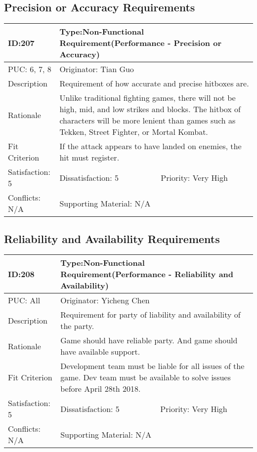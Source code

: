 \documentclass{article}
\begin{document}
	\subsection{Precision or Accuracy Requirements}
	\begin{table}[H]
		\begin{tabular}{|l|l|l|}
			\hline
			ID:207 & \multicolumn{2}{l|}{Type:Non-Functional Requirement(Performance - Precision or Accuracy)} \\ \hline
			PUC: 6, 7, 8 & \multicolumn{2}{l|}{Originator: Tian Guo} \\ \hline
			Description & \multicolumn{2}{m{0.85\textwidth}|}{Requirement of how accurate and precise hitboxes are.} \\ \hline
			Rationale & \multicolumn{2}{m{0.85\textwidth}|}{Unlike traditional fighting games, there will not be high, mid, and low strikes and blocks. The hitbox of characters will be more lenient than games such as Tekken, Street Fighter, or Mortal Kombat.} \\ \hline
			Fit Criterion & \multicolumn{2}{m{0.85\textwidth}|}{If the attack appears to have landed on enemies, the hit must register.} \\ \hline
			Satisfaction: 5 & Dissatisfaction: 5 & Priority: Very High \\ \hline
			Conflicts: N/A & \multicolumn{2}{l|}{Supporting Material: N/A} \\ \hline
		\end{tabular}
	\end{table}

	\subsection{Reliability and Availability Requirements}
	\begin{table}[H]
		\begin{tabular}{|l|l|l|}
			\hline
			ID:208 & \multicolumn{2}{l|}{Type:Non-Functional Requirement(Performance - Reliability and Availability)} \\ \hline
			PUC: All & \multicolumn{2}{l|}{Originator: Yicheng Chen} \\ \hline
			Description & \multicolumn{2}{m{0.85\textwidth}|}{Requirement for party of liability and availability of the party.} \\ \hline
			Rationale & \multicolumn{2}{m{0.85\textwidth}|}{Game should have reliable party. And game should have available support.} \\ \hline
			Fit Criterion & \multicolumn{2}{m{0.85\textwidth}|}{Development team must be liable for all issues of the game. Dev team must be available to solve issues before April 28th 2018.} \\ \hline
			Satisfaction: 5 & Dissatisfaction: 5 & Priority: Very High \\ \hline
			Conflicts: N/A & \multicolumn{2}{l|}{Supporting Material: N/A} \\ \hline
		\end{tabular}
	\end{table}
\end{document}
